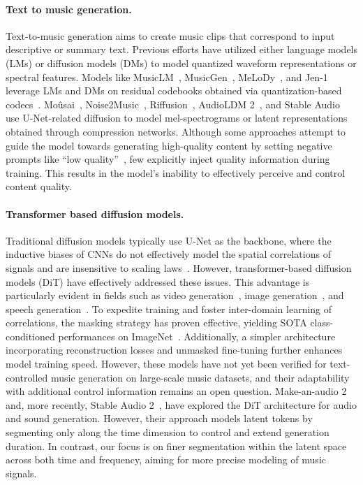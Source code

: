 \paragraph{Text to music generation.}
Text-to-music generation aims to create music clips that correspond to input descriptive or summary text. Previous efforts have utilized either language models (LMs) or diffusion models (DMs) to model quantized waveform representations or spectral features. Models like MusicLM~\citep{agostinelli2023musiclm}, MusicGen~\citep{copet2024simple}, MeLoDy~\citep{lam2024efficient}, and Jen-1~\citep{li2024jen} leverage LMs and DMs on residual codebooks obtained via quantization-based codecs~\citep{zeghidour2021soundstream,defossez2022high}. Moûsai~\citep{schneider2023mo}, Noise2Music~\citep{huang2023noise2music}, Riffusion~\citep{forsgren_martiros_2022}, AudioLDM 2~\citep{liu2023audioldm2}, and Stable Audio~\citep{evans2024fast} use U-Net-related diffusion to model mel-spectrograms or latent representations obtained through compression networks. Although some approaches attempt to guide the model towards generating high-quality content by setting negative prompts like ``low quality''~\citep{liu2023audioldm2, chen2024musicldm}, few explicitly inject quality information during training. This results in the model's inability to effectively perceive and control content quality.

\paragraph{Transformer based diffusion models.}
Traditional diffusion models typically use U-Net as the backbone, where the inductive biases of CNNs do not effectively model the spatial correlations of signals and are insensitive to scaling laws~\citep{li2024scalability}. However, transformer-based diffusion models (DiT) \citep{peebles2023scalable} have effectively addressed these issues. This advantage is particularly evident in fields such as video generation~\citep{brooksvideo}, image generation~\citep{peebles2023scalable,chen2024pixart,bao2022all}, and speech generation~\citep{liu2023vit}. To expedite training and foster inter-domain learning of correlations, the masking strategy has proven effective, yielding SOTA class-conditioned performances on ImageNet~\citep{gao2023masked}. Additionally, a simpler architecture~\citep{zheng2023fast} incorporating reconstruction losses and unmasked fine-tuning further enhances model training speed.
However, these models have not yet been verified for text-controlled music generation on large-scale music datasets, and their adaptability with additional control information remains an open question. Make-an-audio 2~\citep{huang2023make} and, more recently, Stable Audio 2~\citep{123evans2024long}, have explored the DiT architecture for audio and sound generation. However, their approach models latent tokens by segmenting only along the time dimension to control and extend generation duration. In contrast, our focus is on finer segmentation within the latent space across both time and frequency, aiming for more precise modeling of music signals.

